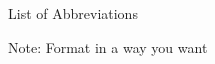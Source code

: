 \clearpage
{}
\begin{centering}
List of Abbreviations\\
\end{centering}

\noindent Note: Format in a way you want \\

\lipsum[1]
